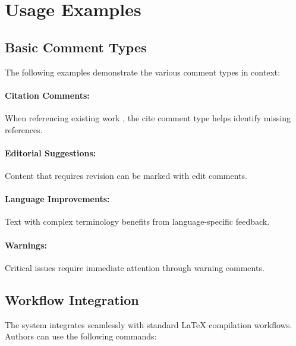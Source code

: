 \documentclass[manuscript]{acmart}
\begin{document}

\section{Usage Examples}

\subsection{Basic Comment Types}

The following examples demonstrate the various comment types in context:

\paragraph{Citation Comments:} When referencing existing work , the cite comment type helps identify missing references.

\paragraph{Editorial Suggestions:} Content that requires revision  can be marked with edit comments.

\paragraph{Language Improvements:} Text with complex terminology  benefits from language-specific feedback.

\paragraph{Warnings:} Critical issues  require immediate attention through warning comments.


\subsection{Workflow Integration}

The system integrates seamlessly with standard LaTeX compilation workflows. Authors can use the following commands:
\end{document}
